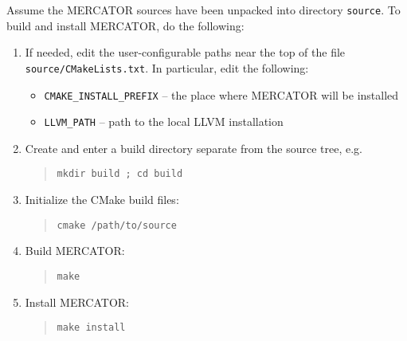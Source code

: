 \documentclass[11pt]{article}
\begin{document}
Assume the MERCATOR sources have been unpacked into directory \texttt{source}.
To build and install MERCATOR, do the following:
\begin{enumerate}

\item If needed, edit the user-configurable paths near the top of the file
      \texttt{source/CMakeLists.txt}.  In particular, edit the following:
 \begin{itemize}
   \item \texttt{CMAKE_INSTALL_PREFIX} -- the place where MERCATOR will be
          installed
   \item \texttt{LLVM_PATH} -- path to the local LLVM installation
 \end{itemize}

\item Create and enter a build directory separate from the source tree, e.g.
\begin{quote}
\texttt{mkdir build ; cd build}
\end{quote}

\item Initialize the CMake build files:
\begin{quote}
\texttt{cmake /path/to/source}
\end{quote}

\item Build MERCATOR:
\begin{quote}
\texttt{make}
\end{quote}

\item Install MERCATOR:
\begin{quote}
\texttt{make install}
\end{quote}

\end{enumerate}
\end{document}
